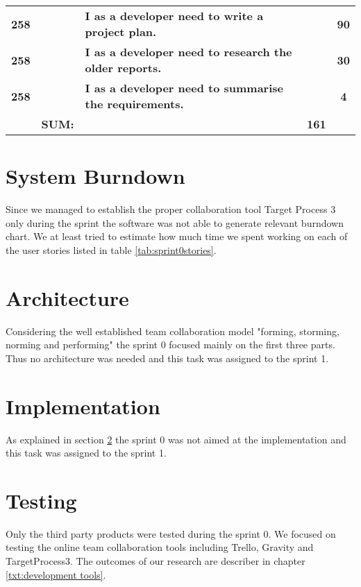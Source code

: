 \begin{table*}[!h]
\begin{tabularx}{\textwidth}{ccXcc}
\textbf{258} 	&
	& \textbf{I as a developer need to write a project plan.} 						&  			& \textbf{90} \\

\textbf{258} 	&
	& \textbf{I as a developer need to research the older reports.} 						&  			& \textbf{30} \\

\textbf{258} 	&
	& \textbf{I as a developer need to summarise the requirements.} 						&  			& \textbf{4} \\
\midrule
				& \textbf{SUM:}		&			& \textbf{161}
 \\																			
\bottomrule[1mm]

\end{tabularx}
\end{table*}

\section{System Burndown}
Since we managed to establish the proper collaboration tool Target Process 3 only during the sprint the software was not able to generate relevant burndown chart.
We at least tried to estimate how much time we spent working on each of the user stories listed in table \ref{tab:sprint0stories}.

\section{Architecture} \label{txt:sprint0architecture}

Considering the well established team collaboration model "forming, storming, norming and performing" the sprint 0 focused mainly on the first three parts.
Thus no architecture was needed and this task was assigned to the sprint 1.

\section{Implementation}

As explained in section \ref{txt:sprint0architecture} the sprint 0 was not aimed at the implementation and this task was assigned to the sprint 1.

\section{Testing}

Only the third party products were tested during the sprint 0. We focused on testing the online team collaboration tools including Trello, Gravity and TargetProcess3. The outcomes of our research are describer in chapter \ref{txt:development tools}.

